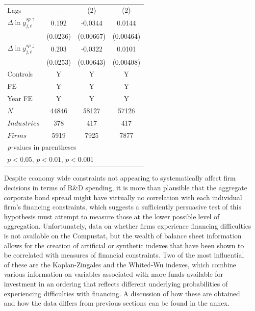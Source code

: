 \documentclass{_latex/house}
\begin{document}
\begin{table}[h]
\begin{center}
{\begin{tabular}{l*{3}{c}}
\hline
Lags & - & (2) & (2) \\
$\Delta\ln{y_{j,t}^{sp \uparrow}}$ & 0.192\sym{***} & -0.0344\sym{***} & 0.0144\sym{**} \\
 & (0.0236) & (0.00667) & (0.00464) \\
[1em]
$\Delta\ln{y_{j,t}^{sp \downarrow}}$ & 0.203\sym{***} & -0.0322\sym{***} & 0.0101\sym{*}  \\
 & (0.0253) & (0.00643) & (0.00408) \\
Controls & Y & Y & Y \\
FE & Y & Y & Y \\
Year FE & Y & Y & Y \\
\hline
\(N\)       &       44846         &       58127         &       57126         \\
\(Industries\)      &       378         &       417         &       417             \\
\(Firms\)      &       5919         &       7925          &       7877        \\
\hline\hline
\multicolumn{4}{l}{\footnotesize \textit{p}-values in parentheses}\\
\multicolumn{4}{l}{\footnotesize \sym{*} \(p<0.05\), \sym{**} \(p<0.01\), \sym{***} \(p<0.001\)}\\
\end{tabular}
}
\end{center}
\end{table}

Despite economy wide constraints not appearing to systematically affect firm decisions in terms of R\&D spending, it is more than plausible that the aggregate corporate bond spread might have virtually no correlation with each individual firm's financing constraints, which suggests a sufficiently persuasive test of this hypothesis must attempt to measure those at the lower possible level of aggregation. Unfortunately, data on whether firms experience financing difficulties is not available on the Compustat, but the wealth of balance sheet information allows for the creation of artificial or synthetic indexes that have been shown to be correlated with measures of financial constraints. Two of the most influential of these are the Kaplan-Zingales and the Whited-Wu indexes, which combine various information on variables associated with more funds available for investment in an ordering that reflects different underlying probabilities of experiencing difficulties with financing. A discussion of how these are obtained and how the data differs from previous sections can be found in the annex.
\end{document}
